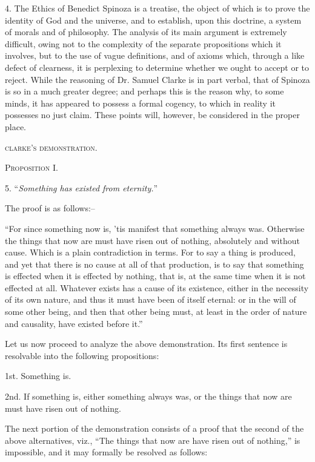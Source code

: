\documentclass[oneside]{book}
\begin{document}
4. The Ethics of Benedict Spinoza is a treatise, the object
of which is to prove the identity of God and the universe, and
to establish, upon this doctrine, a system of morals and of philosophy.
The analysis of its main argument is extremely difficult,
owing not to the complexity of the separate propositions which it
involves, but to the use of vague definitions, and of axioms which,
through a like defect of clearness, it is perplexing to determine
whether we ought to accept or to reject. While the reasoning of
Dr. Samuel Clarke is in part verbal, that of Spinoza is so in a much
greater degree; and perhaps this is the reason why, to some
minds, it has appeared to possess a formal cogency, to which in
reality it possesses no just claim. These points will, however,
be considered in the proper place.

\begin{center}
\textsc{clarke's demonstration.}

\textsc{Proposition I.}
\end{center}

5. ``\textit{Something has existed from eternity.}''

The proof is as follows:--

``For since something now is, 'tis manifest that something
always was. Otherwise the things that now are must have risen
out of nothing, absolutely and without cause. Which is a
plain contradiction in terms. For to say a thing is produced,
and yet that there is no cause at all of that production, is to say
that something is effected when it is effected by nothing, that is,
at the same time when it is not effected at all. Whatever exists
has a cause of its existence, either in the necessity of its own
nature, and thus it must have been of itself eternal: or in the
will of some other being, and then that other being must, at least
in the order of nature and causality, have existed before it.''

Let us now proceed to analyze the above demonstration. Its
first sentence is resolvable into the following propositions:

1st. Something is.

2nd. If something is, either something always was, or the
things that now are must have risen out of nothing.

The next portion of the demonstration consists of a proof
that the second of the above alternatives, viz., ``The things that
now are have risen out of nothing,'' is impossible, and it may
formally be resolved as follows:
\end{document}
